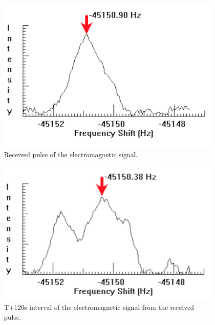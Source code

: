 \documentclass[11pt]{article}
\begin{document}
\begin{multicols}{2}
\begin{figure}[H]
\centering
\includegraphics[scale=0.5]{Present_Images.png/1_-_T.png}
\caption{Received pulse of the electromagnetic signal.}
\label{1-Recieved Pulse}
\end{figure}

\begin{figure}[H]
\centering
\includegraphics[scale=0.5]{Present_Images.png/1_-_T+120ms.png}
\caption{T+120s interval of the electromagnetic signal from the received pulse.}
\label{1-T+120}
\end{figure}


\end{multicols}
\end{document}
